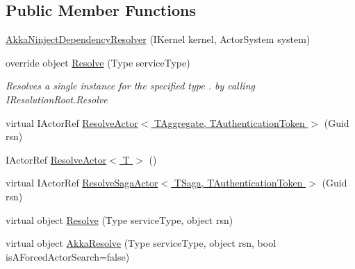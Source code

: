 \subsection*{Public Member Functions}
\begin{DoxyCompactItemize}
\item 
\hyperlink{classCqrs_1_1Ninject_1_1Akka_1_1AkkaNinjectDependencyResolver_a7fdff6e54ac903d86bb79bf5536f8820_a7fdff6e54ac903d86bb79bf5536f8820}{Akka\+Ninject\+Dependency\+Resolver} (I\+Kernel kernel, Actor\+System system)
\item 
override object \hyperlink{classCqrs_1_1Ninject_1_1Akka_1_1AkkaNinjectDependencyResolver_adace29de71f10e34e952bd41e48106a6_adace29de71f10e34e952bd41e48106a6}{Resolve} (Type service\+Type)
\begin{DoxyCompactList}\small\item\em Resolves a single instance for the specified {\itshape type} . by calling I\+Resolution\+Root.\+Resolve \end{DoxyCompactList}\item 
virtual I\+Actor\+Ref \hyperlink{classCqrs_1_1Ninject_1_1Akka_1_1AkkaNinjectDependencyResolver_ab5ba20875aab8764bbb7d6df61722436_ab5ba20875aab8764bbb7d6df61722436}{Resolve\+Actor$<$ T\+Aggregate, T\+Authentication\+Token $>$} (Guid rsn)
\item 
I\+Actor\+Ref \hyperlink{classCqrs_1_1Ninject_1_1Akka_1_1AkkaNinjectDependencyResolver_a6c3399c949a77457456d77688eb66054_a6c3399c949a77457456d77688eb66054}{Resolve\+Actor$<$ T $>$} ()
\item 
virtual I\+Actor\+Ref \hyperlink{classCqrs_1_1Ninject_1_1Akka_1_1AkkaNinjectDependencyResolver_a56da352a605155a1d6572ddb76d9ceea_a56da352a605155a1d6572ddb76d9ceea}{Resolve\+Saga\+Actor$<$ T\+Saga, T\+Authentication\+Token $>$} (Guid rsn)
\item 
virtual object \hyperlink{classCqrs_1_1Ninject_1_1Akka_1_1AkkaNinjectDependencyResolver_ab860d9bcf44b62098a8df91bbcb5013d_ab860d9bcf44b62098a8df91bbcb5013d}{Resolve} (Type service\+Type, object rsn)
\item 
virtual object \hyperlink{classCqrs_1_1Ninject_1_1Akka_1_1AkkaNinjectDependencyResolver_a8e55618bf89a2c14bc3d0e7b3253f17d_a8e55618bf89a2c14bc3d0e7b3253f17d}{Akka\+Resolve} (Type service\+Type, object rsn, bool is\+A\+Forced\+Actor\+Search=false)
\end{DoxyCompactItemize}
